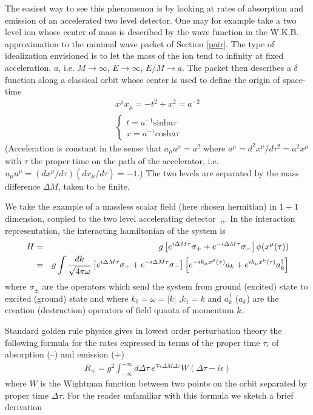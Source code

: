 \documentclass[12pt,oneside]{report}
\begin{document}
 
The easiest way to see this phenomenon is by looking at rates of
absorption and emission of an accelerated two level detector.  One may
for example take a two level ion whose center of mass is described by the wave
function in the W.K.B. approximation to the minimal wave packet of 
Section \ref{pair}.
The type of idealization envisioned is to let the mass of the ion
tend to infinity at fixed acceleration, $a$, i.e. $M \to \infty $,
$E \to \infty $, $E/M \to a$.  The packet then describes a $\delta$ function
along a classical orbit whose center is used to define the origin of 
space-time
\begin{eqnarray}
&x^\mu x_\mu = -t^2 + x^2 = a^{-2}&\nonumber\\ 
& \left\{ \begin{array}{c}t=a^{-1} \mbox{sinh}a \tau\\
x=a^{-1} \mbox{cosh}a \tau
\end{array} \right.&
\label{acctraj}
\end{eqnarray}
(Acceleration is 
 constant in the sense that $a_\mu a^\mu = a^2$ where 
$a^\mu =
d^2 x^\mu/d\tau^2 = a^2 x^\mu
$ with $\tau$  the proper
time on the path of the accelerator, i.e. $u_\mu u^\mu = 
(dx^\mu/d\tau) (dx_\mu/d\tau) =-1$.) The two levels are separated
by the mass difference $\Delta M$, taken to be finite.

 We take the example of a massless scalar field (here chosen
hermitian) in $1 + 1$ dimension, coupled to the two level accelerating
detector~\cite{Unru1},\cite{Davi},\cite{Dewi}. In the interaction
representation, the  interacting hamiltonian of the system is
\begin{eqnarray}
H &=&   g \left[ e^{i \Delta M \tau}\sigma_+ +
e^{-i \Delta M \tau}\sigma_-
\right]
 \phi (x^\mu(\tau))
\nonumber \\
&=& g \int {d k \over \sqrt{
4 \pi \omega}} \left[ e^{i \Delta M \tau}\sigma_+ +
e^{-i \Delta M \tau}\sigma_-
\right]
\left[ e^{-i k_\mu x^\mu(\tau)}a_k
+e^{i k_\mu x^\mu(\tau)}a_k^\dagger \right]
\label{ham}
\end{eqnarray}
where $\sigma_{\pm}$ are the operators which send the system from
ground (excited) state to excited (ground) state and
where $k_0=\omega =\vert k \vert$ ,$k_1 =k$ and $a_k^\dagger$ ($a_k$) are the
creation (destruction) operators of field quanta of momentum $k$.  

 Standard golden rule physics gives in lowest order perturbation
theory the following formula for the rates expressed in terms of the proper 
time $\tau$, of absorption (--) and
emission (+)
\begin{eqnarray}
R_{\mp} = g^2 \int^{+\infty}_{-\infty}\! d\Delta\tau\ e^{\mp i \Delta M
\Delta\tau } W(\Delta\tau  - i\epsilon) \label{rates}
\label{Rone}
\end{eqnarray}
where $W$ is the Wightman function between two points on the orbit
separated by proper time $\Delta\tau $. 
For the reader unfamiliar with this
formula we sketch a brief derivation
\end{document}
